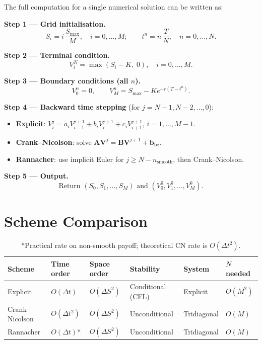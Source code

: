 \documentclass[12pt, a4paper]{article}
\begin{document}
The full computation for a single numerical solution can be written as:

\bigskip
\noindent\textbf{Step 1 — Grid initialisation.}
\[
    S_i = i\,\frac{S_{\max}}{M}, \quad i = 0,\ldots,M; \qquad
    t^n = n\,\frac{T}{N}, \quad n = 0,\ldots,N.
\]

\noindent\textbf{Step 2 — Terminal condition.}
\[
    V_i^N = \max(S_i - K,\; 0), \quad i = 0,\ldots,M.
\]

\noindent\textbf{Step 3 — Boundary conditions (all $n$).}
\[
    V_0^n = 0, \qquad V_M^n = S_{\max} - K e^{-r(T - t^n)}.
\]

\noindent\textbf{Step 4 — Backward time stepping} (for $j = N-1, N-2, \ldots, 0$):
\begin{itemize}[noitemsep]
    \item \textbf{Explicit}: $V_i^j = a_i V_{i-1}^{j+1} + b_i V_i^{j+1} + c_i V_{i+1}^{j+1}$, $i = 1,\ldots,M-1$.
    \item \textbf{Crank--Nicolson}: solve $\mathbf{A}\bm{V}^j = \mathbf{B}\bm{V}^{j+1} + \bm{b}_{\text{bc}}$.
    \item \textbf{Rannacher}: use implicit Euler for $j \geq N - n_{\text{smooth}}$, then Crank--Nicolson.
\end{itemize}

\noindent\textbf{Step 5 — Output.}
\[
    \text{Return } (S_0, S_1, \ldots, S_M) \text{ and } (V_0^0, V_1^0, \ldots, V_M^0).
\]

\section{Scheme Comparison}

\begin{table}[H]
\centering
\caption{Summary comparison of the three implemented schemes}
\begin{tabular}{llllll}
\toprule
\textbf{Scheme} & \textbf{Time order} & \textbf{Space order} & \textbf{Stability} & \textbf{System} & \textbf{$N$ needed} \\
\midrule
Explicit        & $O(\Delta t)$       & $O(\Delta S^2)$      & Conditional (CFL)  & Explicit        & $O(M^2)$ \\
Crank--Nicolson & $O(\Delta t^2)$     & $O(\Delta S^2)$      & Unconditional      & Tridiagonal     & $O(M)$ \\
Rannacher       & $O(\Delta t)$*      & $O(\Delta S^2)$      & Unconditional      & Tridiagonal     & $O(M)$ \\
\bottomrule
\end{tabular}
\caption*{*Practical rate on non-smooth payoff; theoretical CN rate is $O(\Delta t^2)$.}
\end{table}
\end{document}
